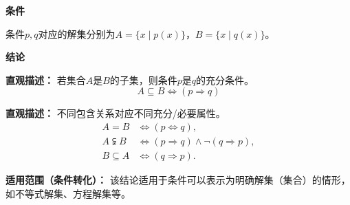 \begin{statementbox}
	\textbf{\textcolor{CStatement}{条件}}
	\begin{description}[style=nextline, leftmargin=2.8em, labelsep=0.5em, itemsep=0.35em]
		\item[\textbf{\textcolor{CStatement}{条件1（解集对应）：}}]
			条件$p,q$对应的解集分别为$A=\{x\mid p(x)\}$，$B=\{x\mid q(x)\}$。
	\end{description}
	\textbf{\textcolor{CStatement}{结论}}
	\begin{description}[style=nextline, leftmargin=2.8em, labelsep=0.5em, itemsep=0.45em]
		\item[\textbf{\textcolor{CStatement}{结论一（包含推充分）：}}]
			\textbf{\textcolor{CStatement}{直观描述：}}
			若集合$A$是$B$的子集，则条件$p$是$q$的充分条件。
			\[
				\boxed{A\subseteq B \Leftrightarrow (p\Rightarrow q)}
			\]
		\item[\textbf{\textcolor{CStatement}{推广结论（包含定条件类型）：}}]
			\textbf{\textcolor{CStatement}{直观描述：}}
			不同包含关系对应不同充分/必要属性。
			\[
				\begin{aligned}
					A=B &\Leftrightarrow (p\Leftrightarrow q),\\ A\subsetneqq B &\Leftrightarrow (p\Rightarrow q)\land\lnot(q\Rightarrow p),\\ B\subseteq A &\Leftrightarrow (q\Rightarrow p).
			\end{aligned}
			\]
	\end{description}

	\medskip
	\textbf{\textcolor{CStatement}{适用范围（条件转化）：}}
	该结论适用于条件可以表示为明确解集（集合）的情形，如不等式解集、方程解集等。
\end{statementbox}
